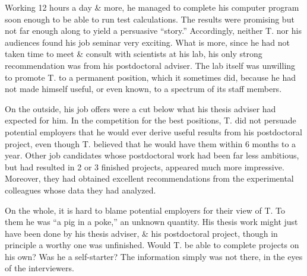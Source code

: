 \documentclass{article}
\begin{document}
\begin{enumerate}
\begin{itemize}
\begin{itemize}
			Working 12 hours a day \& more, he managed to complete his computer program soon enough to be able to run test calculations. The results were promising but not far enough along to yield a persuasive ``story.'' Accordingly, neither T. nor his audiences found his job seminar very exciting. What is more, since he had not taken time to meet \& consult with scientists at his lab, his only strong recommendation was from his postdoctoral adviser. The lab itself was unwilling to promote T. to a permanent position, which it sometimes did, because he had not made himself useful, or even known, to a spectrum of its staff members.

			On the outside, his job offers were a cut below what his thesis adviser had expected for him. In the competition for the best positions, T. did not persuade potential employers that he would ever derive useful results from his postdoctoral project, even though T. believed that he would have them within 6 months to a year. Other job candidates whose postdoctoral work had been far less ambitious, but had resulted in 2 or 3 finished projects, appeared much more impressive. Moreover, they had obtained excellent recommendations from the experimental colleagues whose data they had analyzed.

			On the whole, it is hard to blame potential employers for their view of T. To them he was ``a pig in a poke,'' an unknown quantity. His thesis work might just have been done by his thesis adviser, \& his postdoctoral project, though in principle a worthy one was unfinished. Would T. be able to complete projects on his own? Was he a self-starter? The information simply was not there, in the eyes of the interviewers.


\end{itemize}
\end{itemize}
\end{enumerate}
\end{document}
